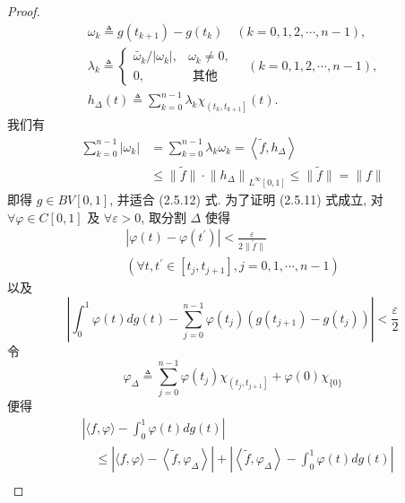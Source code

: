 \documentclass[lang=cn,newtx,10pt,scheme=chinese,thmcnt=chapter]{elegantbook}
\begin{document}
\begin{proof}
\begin{equation*}
\begin{gathered}
\omega_k \triangleq g\left(t_{k+1}\right)-g\left(t_k\right) \quad(k=0,1,2, \cdots, n-1), \\
\lambda_k \triangleq\left\{\begin{array}{ll}
\bar{\omega}_k /\left|\omega_k\right|, & \omega_k \neq 0, \\
0, & \text { 其他 }
\end{array} \quad(k=0,1,2, \cdots, n-1),\right. \\
h_{\Delta}(t) \triangleq \sum_{k=0}^{n-1} \lambda_k \chi_{\left(t_k, t_{k+1}\right]}(t) .
\end{gathered}
\end{equation*}
我们有
\begin{equation*}
\begin{aligned}
\sum_{k=0}^{n-1}\left|\omega_k\right| & =\sum_{k=0}^{n-1} \lambda_k \omega_k=\left\langle\widetilde{f}, h_{\Delta}\right\rangle \\
& \leqslant\|\widetilde{f}\| \cdot\left\|h_{\Delta}\right\|_{L^{\infty}[0,1]} \leqslant\|\widetilde{f}\|=\|f\|
\end{aligned}
\end{equation*}
即得 $g \in B V[0,1]$, 并适合 (2.5.12) 式.
为了证明 (2.5.11) 式成立, 对 $\forall \varphi \in C[0,1]$ 及 $\forall \varepsilon>0$, 取分割 $\Delta$ 使得
\begin{equation*}
\begin{gathered}
\left|\varphi(t)-\varphi\left(t^{\prime}\right)\right|<\frac{\varepsilon}{2\|\widetilde{f}\|} \\
\left(\forall t, t^{\prime} \in\left[t_j, t_{j+1}\right], j=0,1, \cdots, n-1\right)
\end{gathered}
\end{equation*}
以及
\begin{equation*}
\left|\int_0^1 \varphi(t) d g(t)-\sum_{j=0}^{n-1} \varphi\left(t_j\right)\left(g\left(t_{j+1}\right)-g\left(t_j\right)\right)\right|<\frac{\varepsilon}{2}
\end{equation*}
令
\begin{equation*}
\varphi_{\Delta} \triangleq \sum_{j=0}^{n-1} \varphi\left(t_j\right) \chi_{\left(t_j, t_{j+1}\right]}+\varphi(0) \chi_{\{0\}}
\end{equation*}
便得
\begin{equation*}
\begin{aligned}
& \left|\langle f, \varphi\rangle-\int_0^1 \varphi(t) d g(t)\right| \\
& \quad \leqslant\left|\langle f, \varphi\rangle-\left\langle\widetilde{f}, \varphi_{\Delta}\right\rangle\right|+\left|\left\langle\widetilde{f}, \varphi_{\Delta}\right\rangle-\int_0^1 \varphi(t) d g(t)\right| \\

\end{aligned}
\end{equation*}
\end{proof}
\end{document}
